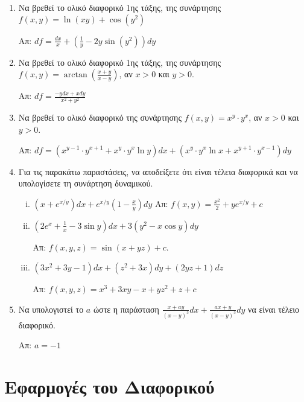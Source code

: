 \begin{enumerate}

    \item Να βρεθεί το ολικό διαφορικό 1ης τάξης, της συνάρτησης 
        $f(x,y)=\ln(xy)+\cos(y^2)$ 

        \hfill Απ: $df=\frac{dx}{x}+\left(\frac{1}{y}-2y\sin(y^2)\right)dy$

    \item Να βρεθεί το ολικό διαφορικό 1ης τάξης, της συνάρτησης 
        $ f(x,y) = \arctan(\frac{ x+y }{ x-y }) $, αν $ x>0 $ και $ y>0 $.

        \hfill Απ: $df = \frac{ -ydx + xdy }{ x^{2} + y^{2} } $ 

    \item Να βρεθεί το ολικό διαφορικό της συνάρτησης $ f(x,y) = x^{y} \cdot y^{x} $, 
        αν $ x>0$ και $ y>0 $.

        \hfill Απ: $df =  (x^{y-1}\cdot y^{x+1} + x^{y}\cdot y^{x} \ln{y} )dx 
        + (x^{y}\cdot y^{x} \ln{x} + x^{y+1} \cdot y^{x-1})dy $ 

    \item Για τις παρακάτω παραστάσεις, να αποδείξετε ότι είναι τέλεια διαφορικά και 
        να υπολογίσετε τη συνάρτηση δυναμικού.
        \begin{enumerate}[i)]
            \item $ \left(x+e^{x/y}\right)dx + e^{x/y}\left(1- \frac{x}{y}\right)dy $
                \hfill Απ: $ f(x,y) = \frac{x^{2}}{2} +y e^{x/y} + c $ 

            \item $\left(2e^{x}+\frac{1}{x}-3\sin y\right)dx+3(y^2-x\cos y)dy$ 

                \hfill  Απ: $ f(x,y,z) = \sin{(x+yz)} +c $.
            \item $ (3x^{2}+3y-1)dx + (z^{2}+3x)dy+(2yz+1)dz $

                \hfill Απ: $ f(x,y,z) = x^{3}+3xy-x+yz^{2}+z+c $

        \end{enumerate}

    \item Να υπολογιστεί το $a$ ώστε η παράσταση $ \frac{ x + ay }{ (x-y)^{3} }dx 
        + \frac{ ax+y }{ (x-y)^{3} }dy $ να είναι τέλειο διαφορικό.

        \hfill Απ: $ a=-1 $

\end{enumerate}

\section{Εφαρμογές του Διαφορικού}

